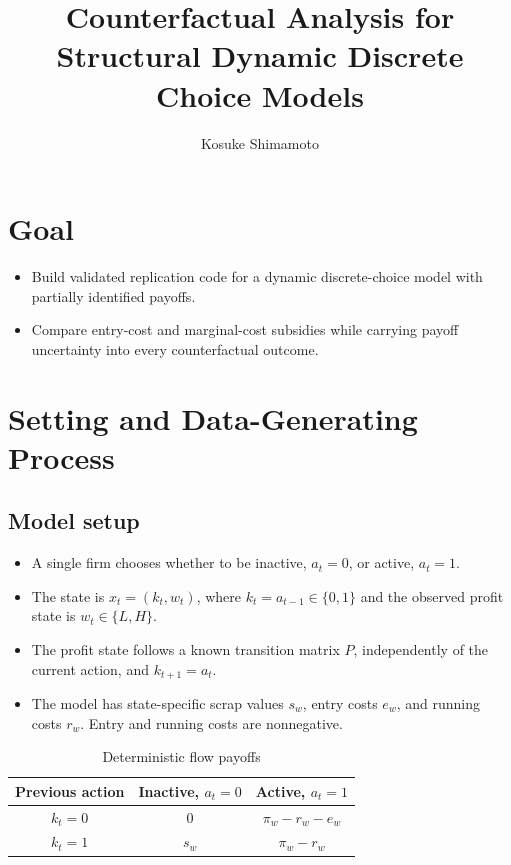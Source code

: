 \documentclass[10pt]{article}
\title{Counterfactual Analysis for Structural Dynamic Discrete Choice Models}
\author{Kosuke Shimamoto}
\date{}
\begin{document}
\maketitle
\vspace{-2.2em}

\section{Goal}

\begin{itemize}
    \item Build validated replication code for a dynamic discrete-choice model with partially identified payoffs.
    \item Compare entry-cost and marginal-cost subsidies while carrying payoff uncertainty into every counterfactual outcome.
\end{itemize}

\section{Setting and Data-Generating Process}

\subsection{Model setup}

\begin{itemize}
    \item A single firm chooses whether to be inactive, $a_t=0$, or active, $a_t=1$.
    \item The state is $x_t=(k_t,w_t)$, where $k_t=a_{t-1}\in\{0,1\}$ and the observed profit state is $w_t\in\{L,H\}$.
    \item The profit state follows a known transition matrix $P$, independently of the current action, and $k_{t+1}=a_t$.
    \item The model has state-specific scrap values $s_w$, entry costs $e_w$, and running costs $r_w$. Entry and running costs are nonnegative.
\end{itemize}

\begin{table}[H]
    \centering
    \caption{Deterministic flow payoffs}
    \begin{tabular}{ccc}
        \toprule
        Previous action & Inactive, $a_t=0$ & Active, $a_t=1$ \\
        \midrule
        $k_t=0$ & $0$ & $\pi_w-r_w-e_w$ \\
        $k_t=1$ & $s_w$ & $\pi_w-r_w$ \\
        \bottomrule
    \end{tabular}
\end{table}
\end{document}
